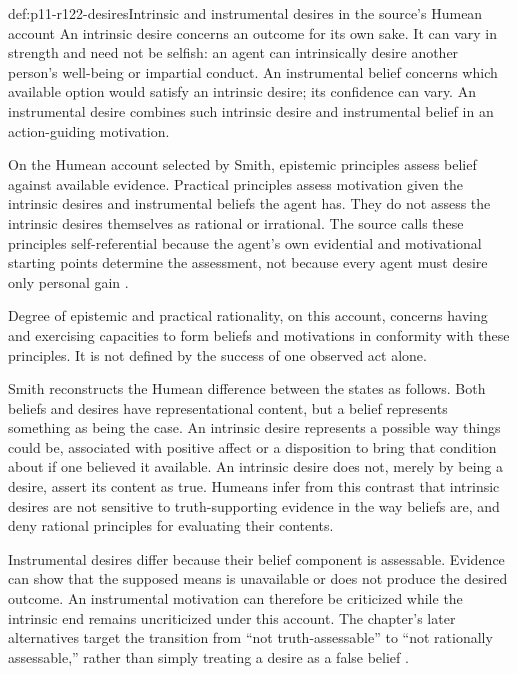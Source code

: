 \begin{hbdefinition}{def:p11-r122-desires}{Intrinsic and instrumental desires in the source's Humean account}
An intrinsic desire concerns an outcome for its own sake. It can vary
in strength and need not be selfish: an agent can intrinsically desire
another person's well-being or impartial conduct. An instrumental belief
concerns which available option would satisfy an intrinsic desire; its
confidence can vary. An instrumental desire combines such intrinsic
desire and instrumental belief in an action-guiding motivation.

On the Humean account selected by Smith, epistemic principles assess
belief against available evidence. Practical principles assess motivation
given the intrinsic desires and instrumental beliefs the agent has.
They do not assess the intrinsic desires themselves as rational or
irrational. The source calls these principles self-referential because
the agent's own evidential and motivational starting points determine
the assessment, not because every agent must desire only personal gain
\parencite[pp.~694--695]{Smith2021MoralReasons}.

Degree of epistemic and practical rationality, on this account, concerns
having and exercising capacities to form beliefs and motivations in
conformity with these principles. It is not defined by the success of
one observed act alone.
\end{hbdefinition}

Smith reconstructs the Humean difference between the states as follows.
Both beliefs and desires have representational content, but a belief
represents something as being the case. An intrinsic desire represents
a possible way things could be, associated with positive affect or a
disposition to bring that condition about if one believed it available.
An intrinsic desire does not, merely by being a desire, assert its
content as true. Humeans infer from this contrast that intrinsic desires
are not sensitive to truth-supporting evidence in the way beliefs are,
and deny rational principles for evaluating their contents.

Instrumental desires differ because their belief component is assessable.
Evidence can show that the supposed means is unavailable or does not
produce the desired outcome. An instrumental motivation can therefore
be criticized while the intrinsic end remains uncriticized under this
account. The chapter's later alternatives target the transition from
``not truth-assessable'' to ``not rationally assessable,'' rather than
simply treating a desire as a false belief
\parencite[pp.~694--697]{Smith2021MoralReasons}.

